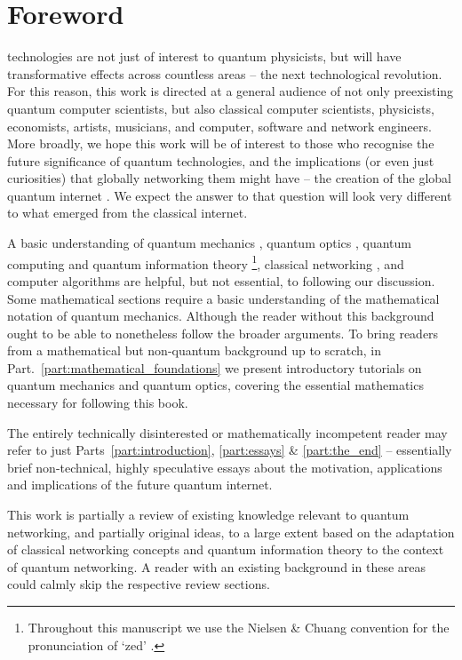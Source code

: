%
%

\section{Foreword}\label{sec:foreword}

 technologies are not just of interest to quantum physicists, but will have transformative effects across countless areas -- the next technological revolution. For this reason, this work is directed at a general audience of not only preexisting quantum computer scientists, but also classical computer scientists, physicists, economists, artists, musicians, and computer, software and network engineers. More broadly, we hope this work will be of interest to those who recognise the future significance of quantum technologies, and the implications (or even just curiosities) that globally networking them might have -- the creation of the global quantum internet \cite{bib:van2014quantum, bib:kimble2008quantum}. We expect the answer to that question will look very different to what emerged from the classical internet.

A basic understanding of quantum mechanics \cite{bib:Sakurai94}, quantum optics \cite{bib:GerryKnight05}, quantum computing and quantum information theory \cite{bib:NielsenChuang00}\footnote{Throughout this manuscript we use the Nielsen \& Chuang convention for the pronunciation of `zed' \cite{bib:NielsenChuang00}.}, classical networking \cite{bib:TanenbaumNet}, and computer algorithms \cite{bib:RivestAlgBook} are helpful, but not essential, to following our discussion. Some mathematical sections require a basic understanding of the mathematical notation of quantum mechanics. Although the reader without this background ought to be able to nonetheless follow the broader arguments. To bring readers from a mathematical but non-quantum background up to scratch, in Part.~\ref{part:mathematical_foundations} we present introductory tutorials on quantum mechanics and quantum optics, covering the essential mathematics necessary for following this book.

The entirely technically disinterested or mathematically incompetent reader may refer to just Parts~\ref{part:introduction}, \ref{part:essays} \& \ref{part:the_end} -- essentially brief non-technical, highly speculative essays about the motivation, applications and implications of the future quantum internet.

This work is partially a review of existing knowledge relevant to quantum networking, and partially original ideas, to a large extent based on the adaptation of classical networking concepts and quantum information theory to the context of quantum networking. A reader with an existing background in these areas could calmly skip the respective review sections.

